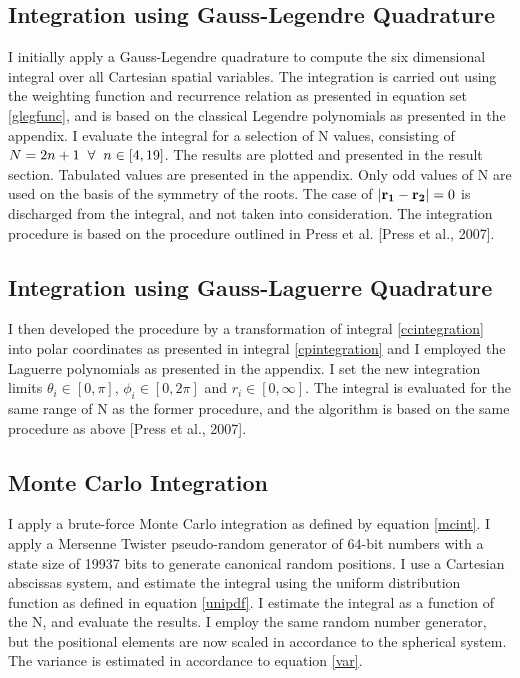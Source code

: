 \documentclass[%
reprint,
amsmath,amssymb,
aps,
]{revtex4-1}
\begin{document}
\subsection{Integration using Gauss-Legendre Quadrature}\noindent 
I initially apply a Gauss-Legendre quadrature to compute the six dimensional integral over all Cartesian spatial variables. The integration is carried out using the weighting function and recurrence relation as presented in equation set \ref{glegfunc}, and is based on the classical Legendre polynomials as presented in the appendix. I evaluate the integral for a selection of N values, consisting of $N = 2n+1 \hspace{2mm} \forall \hspace{2mm}n\in[4,19]$. The results are plotted and presented in the result section. Tabulated values are presented in the appendix. Only odd values of N are used on the basis of the symmetry of the roots. The case of  $\abs{\mathbf{r_1} -\mathbf{r_2}} = 0$ is discharged from the integral, and not taken into consideration. The integration procedure is based on the procedure outlined in Press et al. [Press et al., 2007].

\subsection{Integration using Gauss-Laguerre Quadrature} \noindent 
I then developed the procedure by a transformation of integral \ref{ccintegration} into polar coordinates as presented in integral \ref{cpintegration} and I employed the Laguerre polynomials as presented in the appendix. I set the new integration limits $\theta_i \in [0,\pi]$, $\phi_i \in [0,2\pi]$ and $r_i\in[0,\infty]$. The integral is evaluated for the same range of N as the former procedure, and the algorithm is based on the same procedure as above [Press et al., 2007].

\subsection{Monte Carlo Integration}
I apply a brute-force Monte Carlo integration as defined by equation \ref{mcint}. I apply a Mersenne Twister pseudo-random generator of 64-bit numbers with a state size of 19937 bits to generate canonical random positions. I use a Cartesian abscissas system, and estimate the integral using the uniform distribution function as defined in equation \ref{unipdf}. I estimate the integral as a function of the N, and evaluate the results. I employ the same random number generator, but the positional elements are now scaled in accordance to the spherical system. The variance is estimated in accordance to equation \ref{var}.
\end{document}

